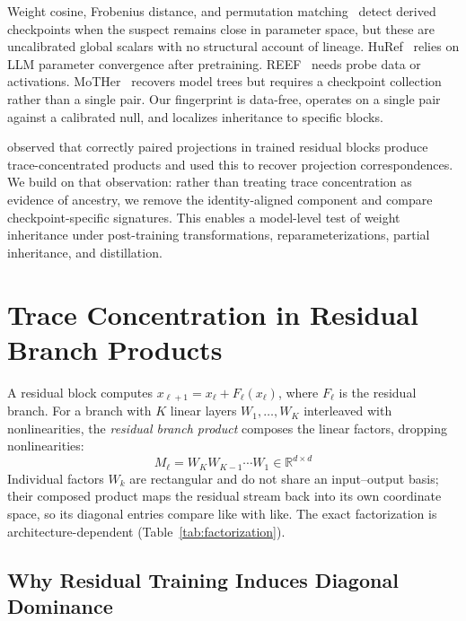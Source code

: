 \documentclass[letterpaper]{article}
\begin{document}
Weight cosine, Frobenius distance, and permutation matching~\citep{ainsworth2023git} detect derived checkpoints when the suspect remains close in parameter space, but these are uncalibrated global scalars with no structural account of lineage. HuRef~\citep{zeng2025huref} relies on LLM parameter convergence after pretraining. REEF~\citep{zhang2024reef} needs probe data or activations. MoTHer~\citep{horwitz2025mother} recovers model trees but requires a checkpoint collection rather than a single pair. Our fingerprint is data-free, operates on a single pair against a calibrated null, and localizes inheritance to specific blocks.

\citet{park2026idroppedneuralnet} observed that correctly paired projections in trained residual blocks produce trace-concentrated products and used this to recover projection correspondences. We build on that observation: rather than treating trace concentration as evidence of ancestry, we remove the identity-aligned component and compare checkpoint-specific signatures. This enables a model-level test of weight inheritance under post-training transformations, reparameterizations, partial inheritance, and distillation.


\section{Trace Concentration in Residual Branch Products}\label{sec:diagonal-dominance}

A residual block computes $x_{\ell+1} = x_\ell + F_\ell(x_\ell)$, where $F_\ell$ is the residual branch. For a branch with $K$ linear layers $W_1, \ldots, W_K$ interleaved with nonlinearities, the \emph{residual branch product} composes the linear factors, dropping nonlinearities:
\begin{equation}\label{eq:branch-product}
M_\ell = W_K W_{K-1} \cdots W_1 \in \mathbb{R}^{d \times d}
\end{equation}
Individual factors $W_k$ are rectangular and do not share an input--output basis; their composed product maps the residual stream back into its own coordinate space, so its diagonal entries compare like with like. The exact factorization is architecture-dependent (Table~\ref{tab:factorization}).

\subsection{Why Residual Training Induces Diagonal Dominance}\label{sec:mechanism}
\end{document}
